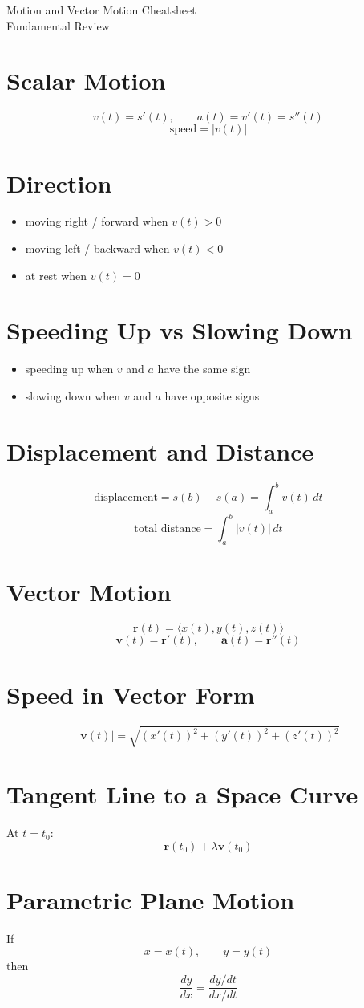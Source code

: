 \documentclass[11pt]{article}
\begin{document}
\begin{center}
{\LARGE Motion and Vector Motion Cheatsheet}\\[0.4em]
{\large Fundamental Review}
\end{center}

\section*{Scalar Motion}
\[
v(t)=s'(t),\qquad a(t)=v'(t)=s''(t)
\]
\[
\text{speed}=|v(t)|
\]

\section*{Direction}
\begin{itemize}
  \item moving right / forward when $v(t)>0$
  \item moving left / backward when $v(t)<0$
  \item at rest when $v(t)=0$
\end{itemize}

\section*{Speeding Up vs Slowing Down}
\begin{itemize}
  \item speeding up when $v$ and $a$ have the same sign
  \item slowing down when $v$ and $a$ have opposite signs
\end{itemize}

\section*{Displacement and Distance}
\[
\text{displacement}=s(b)-s(a)=\int_a^b v(t)\,dt
\]
\[
\text{total distance}=\int_a^b |v(t)|\,dt
\]

\section*{Vector Motion}
\[
\mathbf{r}(t)=\langle x(t),y(t),z(t)\rangle
\]
\[
\mathbf{v}(t)=\mathbf{r}'(t),\qquad \mathbf{a}(t)=\mathbf{r}''(t)
\]

\section*{Speed in Vector Form}
\[
|\mathbf{v}(t)|=\sqrt{(x'(t))^2+(y'(t))^2+(z'(t))^2}
\]

\section*{Tangent Line to a Space Curve}
At $t=t_0$:
\[
\mathbf{r}(t_0)+\lambda \mathbf{v}(t_0)
\]

\section*{Parametric Plane Motion}
If
\[
x=x(t),\qquad y=y(t)
\]
then
\[
\frac{dy}{dx}=\frac{dy/dt}{dx/dt}
\]
\end{document}
